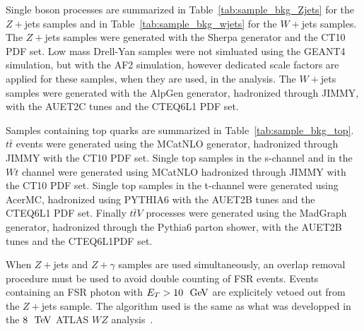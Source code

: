 Single boson processes are summarized in Table~\ref{tab:sample_bkg_Zjets} for the $Z+$jets samples and in Table~\ref{tab:sample_bkg_wjets} for the $W+$jets samples. The $Z+$jets samples were generated with the Sherpa generator and the CT10 PDF set. Low mass Drell-Yan samples were not simluated using the GEANT4 simulation, but with the AF2 simulation, however dedicated scale factors are applied for these samples, when they are used, in the analysis. The $W+$jets samples were generated with the AlpGen generator, hadronized through JIMMY, with the AUET2C tunes and the CTEQ6L1 PDF set.

Samples containing top quarks are summarized in Table~\ref{tab:sample_bkg_top}. $t\bar{t}$ events were generated using the MCatNLO\cite{MCatNLO} generator, hadronized through JIMMY with the CT10 PDF set. Single top samples in the s-channel and in the $Wt$ channel were generated using MCatNLO hadronized through JIMMY with the CT10 PDF set. Single top samples in the t-channel were generated using AcerMC\cite{Kersevan:2004yg}, hadronized using PYTHIA6 with the AUET2B tunes and the CTEQ6L1 PDF set. Finally $t\bar{t}V$ processes were generated using the MadGraph generator, hadronized through the Pythia6 parton shower, with the AUET2B tunes and the CTEQ6L1PDF set.



When $Z+$jets and $Z+\gamma$ samples are used simultaneously, an overlap removal procedure must be used to avoid double counting of FSR events. Events containing an FSR photon with $E_{T}>10~\GeV$ are explicitely vetoed out from the $Z+$jets sample. The algorithm used is the same as what was developped in the $8~\TeV$ ATLAS $WZ$ analysis~\cite{Anger:1663539}.


